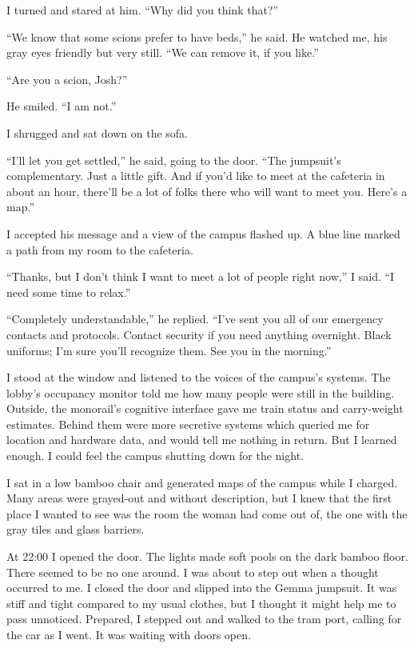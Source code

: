 \documentclass[10pt,b5paper]{article}
\begin{document}
I turned and stared at him. ``Why did you think that?''

``We know that some scions prefer to have beds,'' he said. He watched
me, his gray eyes friendly but very still. ``We can remove it, if
you like.''

``Are you a scion, Josh?''

He smiled. ``I am not.''

I shrugged and sat down on the sofa.

``I'll let you get settled,'' he said, going to the door. ``The
jumpsuit's complementary. Just a little gift. And if you'd like to
meet at the cafeteria in about an hour, there'll be a lot of folks
there who will want to meet you. Here's a map.''

I accepted his message and a view of the campus flashed up. A blue
line marked a path from my room to the cafeteria.

``Thanks, but I don't think I want to meet a lot of people right now,''
I said. ``I need some time to relax.''

``Completely understandable,'' he replied.  ``I've sent you all
of our emergency contacts and protocols. Contact security if you
need anything overnight. Black uniforms; I'm sure you'll recognize
them. See you in the morning.''

\bigskip

I stood at the window and listened to the voices of the campus's
systems.  The lobby's occupancy monitor told me how many people were
still in the building. Outside, the monorail's cognitive interface
gave me train status and carry-weight estimates. Behind them were more
secretive systems which queried me for location and hardware data,
and would tell me nothing in return. But I learned enough. I could
feel the campus shutting down for the night.

I sat in a low bamboo chair and generated maps of the campus while
I charged. Many areas were grayed-out and without description, but
I knew that the first place I wanted to see was the room the woman
had come out of, the one with the gray tiles and glass barriers.

At 22:00 I opened the door.  The lights made soft pools on the dark
bamboo floor.  There seemed to be no one around. I was about to step
out when a thought occurred to me. I closed the door and slipped
into the Gemma jumpsuit. It was stiff and tight compared to my usual
clothes, but I thought it might help me to pass unnoticed. Prepared,
I stepped out and walked to the tram port, calling for the car as
I went.  It was waiting with doors open.
\end{document}
